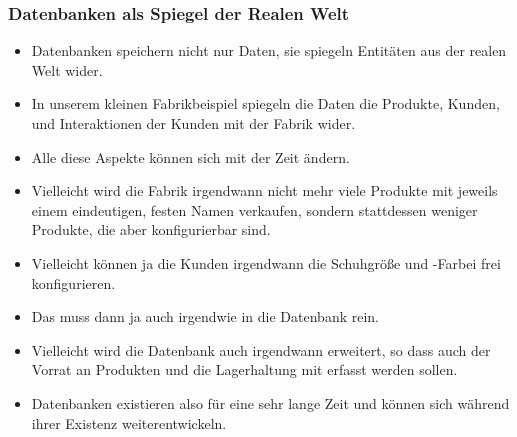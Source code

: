 \documentclass[aspectratio=169,mathserif,notheorems]{beamer}%
\begin{document}
%
\begin{frame}%
\frametitle{Datenbanken als Spiegel der Realen Welt}%
%
\begin{itemize}%
\item Datenbanken speichern nicht nur Daten, sie spiegeln Entitäten aus der realen Welt wider.%
%
\item<2-> In unserem kleinen Fabrikbeispiel spiegeln die Daten die Produkte, Kunden, und Interaktionen der Kunden mit der Fabrik wider.%
%
\item<3-> Alle diese Aspekte können sich mit der Zeit ändern.%
%
\item<4-> Vielleicht wird die Fabrik irgendwann nicht mehr viele Produkte mit jeweils einem eindeutigen, festen Namen verkaufen, sondern stattdessen weniger Produkte, die aber konfigurierbar sind.%
%
\item<5-> Vielleicht können ja die Kunden irgendwann die Schuhgröße und -Farbei frei konfigurieren.%
%
\item<6-> Das muss dann ja auch irgendwie in die Datenbank rein.%
%
\item<7-> Vielleicht wird die Datenbank auch irgendwann erweitert, so dass auch der Vorrat an Produkten und die Lagerhaltung mit erfasst werden sollen.%
%
\item<8-> Datenbanken existieren also für eine sehr lange Zeit und können sich während ihrer Existenz weiterentwickeln.%
%
\end{itemize}%
\end{frame}%
%
\end{document}
